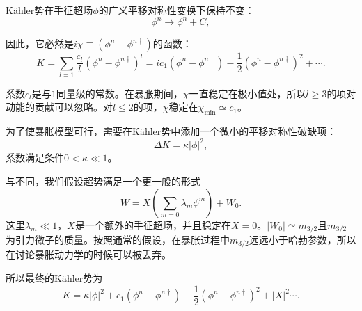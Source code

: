 K\"ahler势在手征超场$\phi$的广义平移对称性变换下保持不变：
\begin{equation}
    \phi^n \rightarrow \phi^n + C,
\end{equation}

因此，它必然是$i\chi \equiv (\phi^n - \phi^{n\dagger})$的函数：
\begin{equation}
    K = \sum_{l=1}\frac{c_l}{l}{\left(\phi^n-\phi^{n\dagger}\right)}^l
    =
    i c_1(\phi^n-\phi^{n\dagger})-\frac{1}{2}{\left(\phi^n-\phi^{n\dagger}\right)}^2+\cdots.
\end{equation}

系数$c_l$是与$1$同量级的常数。在暴胀期间，$\chi$一直稳定在极小值处，所以$l\ge
3$的项对动能的贡献可以忽略\citep{takahashi2010linear}。对$l\le2$的项，$\chi$稳定在$\chi_{\text{min}}\simeq
c_1$。

为了使暴胀模型可行，需要在K\"ahler势中添加一个微小的平移对称性破缺项：
\begin{equation}
    \Delta{K} = \kappa \left|\phi\right|^2,
\end{equation}
系数满足条件$0< \kappa \ll 1$。

与\citep{nakayama2010running}不同，我们假设超势满足一个更一般的形式\citep{nakayama2013polynomial,kawasaki2000natural,kawasaki2001natural,kallosh2010new,kallosh2011general}
\begin{equation}
    W = X\left(\sum_{m=0}\lambda_m\phi^m\right)+W_0.
\end{equation}
这里$\lambda_m\ll
1$，$X$是一个额外的手征超场，并且稳定在$X=0$。$\left|W_0\right|\simeq
m_{3/2}$且$m_{3/2}$为引力微子的质量。按照通常的假设，在暴胀过程中$m_{3/2}$远远小于哈勃参数，所以在讨论暴胀动力学的时候可以被丢弃。

所以最终的K\"ahler势为
\begin{equation}
    K = \kappa |\phi|^2 + c_1(\phi^n-\phi^{n\dagger}) -
    \frac{1}{2}{(\phi^n-\phi^{n\dagger})}^2 + |X|^2\cdots.
\end{equation}

